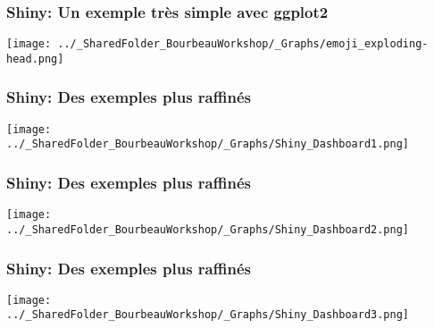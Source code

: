 \documentclass{beamer}
\begin{document}

    \begin{frame}
    
      \frametitle{Shiny: Un exemple très simple avec ggplot2} \vspace{1cm}
      
        \begin{center}
      	  \texttt{[image: ../\_SharedFolder\_BourbeauWorkshop/\_Graphs/emoji\_exploding-head.png]}
        \end{center} 
      
          
    \end{frame}     
    
    

    \begin{frame}
    
      \frametitle{Shiny: Des exemples plus raffinés} \vspace{1cm}
      
        \begin{center}
      	  \texttt{[image: ../\_SharedFolder\_BourbeauWorkshop/\_Graphs/Shiny\_Dashboard1.png]}
        \end{center} 
      
          
    \end{frame}  
    

    \begin{frame}
    
      \frametitle{Shiny: Des exemples plus raffinés} \vspace{1cm}
      
        \begin{center}
      	  \texttt{[image: ../\_SharedFolder\_BourbeauWorkshop/\_Graphs/Shiny\_Dashboard2.png]}
        \end{center} 
      
          
    \end{frame}  
    
    

    \begin{frame}
    
      \frametitle{Shiny: Des exemples plus raffinés} \vspace{1cm}
      
        \begin{center}
      	  \texttt{[image: ../\_SharedFolder\_BourbeauWorkshop/\_Graphs/Shiny\_Dashboard3.png]}
        \end{center} 
      
          
    \end{frame}  
    
\end{document}
